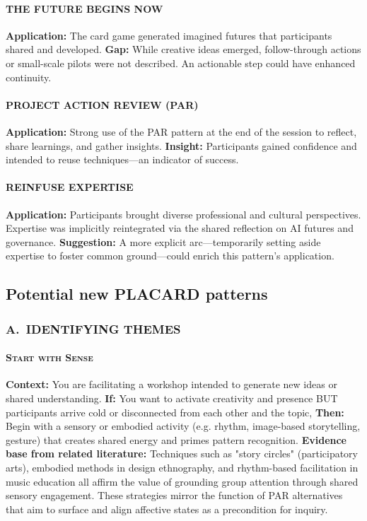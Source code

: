 \documentclass[acmlarge,timestamp]{acmart}
\begin{document}
{\paragraph*{THE FUTURE BEGINS NOW}

\noindent \textbf{Application:} The card game generated imagined futures that participants shared and developed. \textbf{Gap:} While creative ideas emerged, follow-through actions or small-scale pilots were not described. An actionable step could have enhanced continuity.

\paragraph*{PROJECT ACTION REVIEW (PAR)}

\noindent \textbf{Application:} Strong use of the PAR pattern at the end of the session to reflect, share learnings, and gather insights. \textbf{Insight:} Participants gained confidence and intended to reuse techniques—an indicator of success.

\paragraph*{REINFUSE EXPERTISE}

\noindent \textbf{Application:} Participants brought diverse professional and cultural perspectives. Expertise was implicitly reintegrated via the shared reflection on AI futures and governance. \textbf{Suggestion:} A more explicit arc—temporarily setting aside expertise to foster common ground—could enrich this pattern’s application.

\subsection*{Potential new PLACARD patterns}

\subsubsection*{A.~IDENTIFYING THEMES}

\paragraph*{{\scshape Start with Sense}}

\noindent\textbf{Context:} You are facilitating a workshop intended to generate new ideas or shared understanding.
\textbf{If:} You want to activate creativity and presence BUT participants arrive cold or disconnected from each other and the topic,
\textbf{Then:} Begin with a sensory or embodied activity (e.g. rhythm, image-based storytelling, gesture) that creates shared energy and primes pattern recognition.
\textbf{Evidence base from related literature:} Techniques such as "story circles" (participatory arts), embodied methods in design ethnography, and rhythm-based facilitation in music education all affirm the value of grounding group attention through shared sensory engagement. These strategies mirror the function of PAR alternatives that aim to surface and align affective states as a precondition for inquiry.

}
\end{document}
